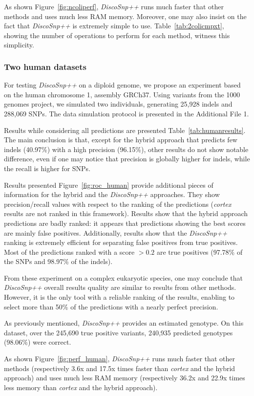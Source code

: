 \documentclass{bmcart}
\newcommand{\discopp}{{\it DiscoSnp++}\xspace}
\newcommand{\co}{{\it cortex}\xspace}
\begin{document}
As shown Figure~\ref{fig:ncoliperf}, \discopp runs much faster that other methods and uses much less RAM memory. Moreover, one may also insist on the fact that \discopp is extremely simple to use. Table~\ref{tab:2colicmpxt}, showing the number of operations to perform for each method, witness this simplicity.

\subsubsection*{Two human datasets}
\label{ssec:twohumans}
For testing \discopp on a diploid genome, we propose an experiment based on the human chromosome 1, assembly GRCh37. Using variants from the 1000 genomes project, we simulated two individuals, generating 25,928 indels and 288,069 SNPs. The data simulation protocol is presented in the Additional File 1. 

Results while considering all predictions are presented Table~\ref{tab:humanresults}. 
The main conclusion is that, except for the hybrid approach that predicts few indels (40.97\%) with a high precision (96.15\%), other results do not show  notable difference, even if one may notice that precision is globally higher for indels, while the recall is higher for SNPs. 

Results presented Figure~\ref{fig:roc_human} provide additional pieces of information for the hybrid and the \discopp approaches. They show precision/recall values with respect to the ranking of the predictions (\co results are not ranked in this framework). Results show that the hybrid approach predictions are badly ranked: it appears that predictions showing the best scores are mainly false positives. Additionally, results show that the \discopp ranking is extremely efficient for separating false positives from true positives. Most of the predictions ranked with a score $>0.2$ are true positives (97.78\%  of the SNPs and 98.97\% of the indels). 

From these experiment on a complex eukaryotic species, one may conclude that \discopp overall results quality are similar to results from other methods. However, it is the only tool with a reliable ranking of the results, enabling to select more than 50\% of the predictions with a nearly perfect precision.


As previously mentioned, \discopp provides an estimated genotype. On this dataset, over the 245,690 true positive variants, 240,935 predicted genotypes (98.06\%) were correct.

As shown Figure~\ref{fig:perf_human}, \discopp runs much faster that other methods (respectively 3.6x and 17.5x times faster than \co and the hybrid approach) and uses much less RAM memory (respectively 36.2x and 22.9x times less memory than \co and the hybrid approach). 
\end{document}
